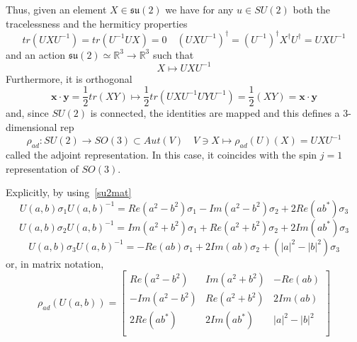     Thus, given an element $X \in \mathfrak{su}(2)$ we have for any $u \in SU(2)$ both the tracelessness and the hermiticy properties
    \begin{equation*}
        tr(U X U^{-1}) = tr(U^{-1} U X) = 0 \quad (UXU^{-1})^\dagger = (U^{-1})^\dagger X^\dagger U^\dagger = U X U^{-1}
    \end{equation*}
    and an action $\mathfrak{su}(2) \simeq \mathbb R^3 \rightarrow \mathbb R^3$ such that
    \begin{equation*}
        X \mapsto U X U^{-1}
    \end{equation*} 
    Furthermore, it is orthogonal 
    \begin{equation*}
        \mathbf x \cdot \mathbf y = \frac{1}{2} tr (XY) \mapsto \frac{1}{2} tr (UXU^{-1} U Y U^{-1}) = \frac{1}{2} (XY) = \mathbf x \cdot \mathbf y
    \end{equation*}
    and, since $SU(2)$ is connected, the identities are mapped and this defines a $3$-dimensional rep
    \begin{equation*}
        \rho_{ad} \colon SU(2) \rightarrow SO(3) \subset Aut(V) \quad V \ni X \mapsto \rho_{ad} (U) (X) = U X U^{-1}
    \end{equation*}
    called the adjoint representation. In this case, it coincides with the spin $j = 1$ representation of $SO(3)$.

    Explicitly, by using~\eqref{su2mat}
    \begin{equation*}
        U(a,b) \sigma_1 U(a,b)^{-1} = Re(a^2 - b^2) \sigma_1 - Im(a^2 - b^2) \sigma_2 + 2 Re (a b^*) \sigma_3
    \end{equation*}
    \begin{equation*}
        U(a,b) \sigma_2 U(a,b)^{-1} = Im(a^2 + b^2) \sigma_1 + Re(a^2 + b^2) \sigma_2 + 2 Im (a b^*) \sigma_3
    \end{equation*}
    \begin{equation*}
        U(a,b) \sigma_3 U(a,b)^{-1} = - Re(ab) \sigma_1 + 2 Im(ab) \sigma_2 + (|a|^2 - |b|^2) \sigma_3
    \end{equation*}
    or, in matrix notation,
    \begin{equation*}
        \rho_{ad} (U(a,b)) = \begin{bmatrix}
            Re(a^2 - b^2) & Im(a^2 + b^2) &  - Re(ab) \\ 
            - Im(a^2 - b^2) & Re(a^2 + b^2) & 2 Im(ab) \\
            2 Re (a b^*) & 2 Im (a b^*) & |a|^2 - |b|^2 \\
        \end{bmatrix}
    \end{equation*}
    
